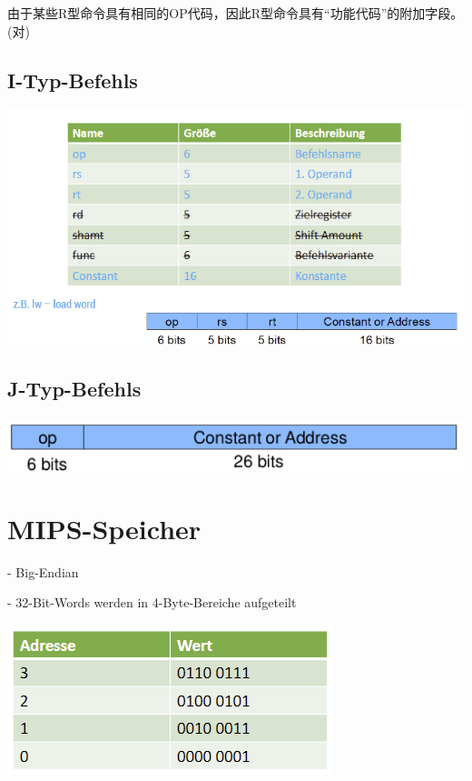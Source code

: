\documentclass[fleqn]{article}
\begin{document}
由于某些R型命令具有相同的OP代码，因此R型命令具有“功能代码”的附加字段。(对)

\subsection{I-Typ-Befehls}

\begin{center}
    \includegraphics[scale=0.5]{27.png}
\end{center}

\subsection{J-Typ-Befehls}

\begin{center}
    \includegraphics[scale=0.5]{28.png}
\end{center}

\section{MIPS-Speicher}

- Big-Endian

- 32-Bit-Words werden in 4-Byte-Bereiche aufgeteilt

\begin{center}
    \includegraphics[scale=0.5]{29.png}
\end{center}
\end{document}
